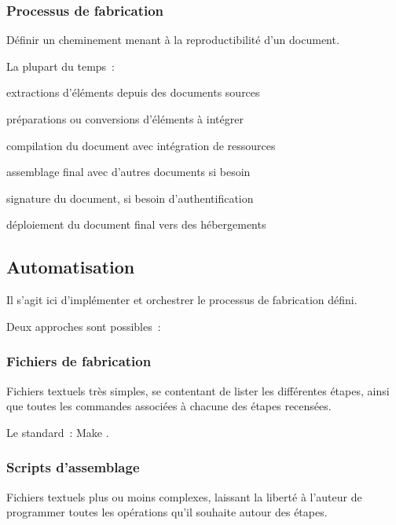 \pagebreak
\subsubsection{Processus de fabrication}

Définir un cheminement menant à la reproductibilité d’un document.

La plupart du temps :
\begin{itmz}
\item{extractions d’éléments depuis des documents sources}
\item{préparations ou conversions d’éléments à intégrer}
\item{compilation du document avec intégration de ressources}
\item{assemblage final avec d’autres documents si besoin}
\item{signature du document, si besoin d’authentification}
\item{déploiement du document final vers des hébergements}
\end{itmz}

\hr

\subsection{Automatisation}

Il s’agit ici d’implémenter et orchestrer le processus de fabrication défini.

Deux approches sont possibles :

\subsubsection{Fichiers de fabrication}

Fichiers textuels très simples, se contentant de lister les différentes étapes,
ainsi que toutes les commandes associées à chacune des étapes recensées.

Le standard : Make \cite{make}.

\subsubsection{Scripts d’assemblage}

Fichiers textuels plus ou moins complexes, laissant la liberté à l’auteur
de programmer toutes les opérations qu’il souhaite autour des étapes.

